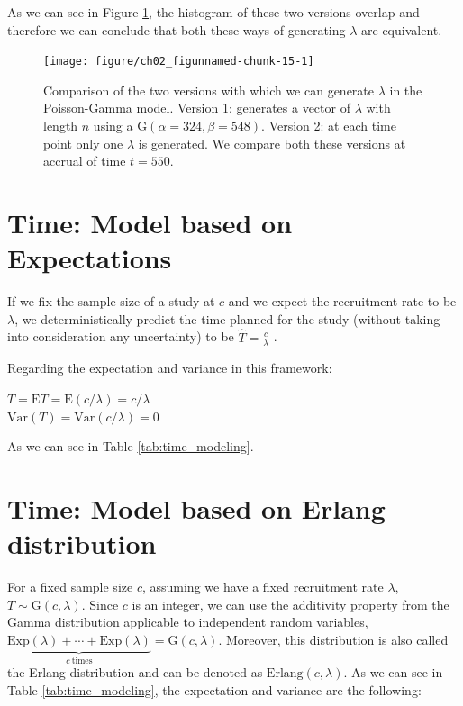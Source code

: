 As we can see in Figure \ref{fig:2_12}, the histogram of these two versions overlap and therefore we can conclude that both these ways of generating $\lambda$ are equivalent.


\begin{figure}
\begin{knitrout}
\color{fgcolor}

{\centering \texttt{[image: figure/ch02\_figunnamed-chunk-15-1]} 

}


\end{knitrout}
  \caption{Comparison of the two versions with which we can generate $\lambda$ in the Poisson-Gamma model. Version 1: generates a vector of $\lambda$ with length $n$ using a $\textrm{G}(\alpha = 324, \beta = 548)$. Version 2: at each time point only one $\lambda$ is generated. We compare both these versions at accrual of time $t=550$.}
  \label{fig:2_12}
\end{figure}

\section{Time: Model based on Expectations}

If we fix the sample size of a study at $c$ and we expect the recruitment rate to be $\lambda$, we deterministically predict the time planned for the study (without taking into consideration any uncertainty) to be $\hat{T}=\frac{c}{\lambda}$ \citep{bagiella2001predicting}.

Regarding the expectation and variance in this framework:

$T = \textrm{E}T = \textrm{E}(c/\lambda) = c/\lambda$\\
$\textrm{Var}(T) = \textrm{Var}(c/\lambda) = 0$

As we can see in Table \ref{tab:time_modeling}.

\section{Time: Model based on Erlang distribution}

For a fixed sample size $c$, assuming we have a fixed recruitment rate $\lambda$, $T\sim\textrm{G}(c, \lambda)$. Since $c$ is an integer, we can use the additivity property from the Gamma distribution applicable to independent random variables, $\underbrace{\textrm{Exp} (\lambda) +\cdots +\textrm{Exp} (\lambda)}_{c \ \text{times}} = \textrm{G} (c, \lambda)$. Moreover, this distribution is also called the Erlang distribution and can be denoted as $\textrm{Erlang} (c, \lambda)$. As we can see in Table \ref{tab:time_modeling}, the expectation and variance are the following:

